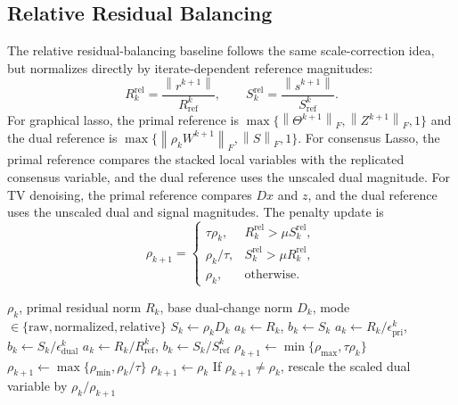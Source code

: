 \documentclass[11pt]{article}
\newcommand{\norm}[1]{\left\lVert #1 \right\rVert}
\begin{document}
\subsection{Relative Residual Balancing}

The relative residual-balancing baseline follows the same scale-correction
idea, but normalizes directly by iterate-dependent reference magnitudes:
\begin{equation}
    R_k^{\mathrm{rel}}
    =
    \frac{\norm{r^{k+1}}}{R_{\mathrm{ref}}^k},
    \qquad
    S_k^{\mathrm{rel}}
    =
    \frac{\norm{s^{k+1}}}{S_{\mathrm{ref}}^k}.
\end{equation}
For graphical lasso, the primal reference is
$\max\{\norm{\Theta^{k+1}}_F,\norm{Z^{k+1}}_F,1\}$ and the dual reference is
$\max\{\norm{\rho_k W^{k+1}}_F,\norm{S}_F,1\}$.  For consensus Lasso, the
primal reference compares the stacked local variables with the replicated
consensus variable, and the dual reference uses the unscaled dual magnitude.
For TV denoising, the primal reference compares $Dx$ and $z$, and the dual
reference uses the unscaled dual and signal magnitudes.  The penalty update is
\begin{equation}
    \rho_{k+1}
    =
    \begin{cases}
        \tau\rho_k, & R_k^{\mathrm{rel}}>\mu S_k^{\mathrm{rel}},\\
        \rho_k/\tau, & S_k^{\mathrm{rel}}>\mu R_k^{\mathrm{rel}},\\
        \rho_k, & \text{otherwise}.
    \end{cases}
\end{equation}

\begin{algorithm}[t]
\caption{Residual-balancing penalty update}
\label{alg:residual-balancing}
\begin{algorithmic}[1]
\Require $\rho_k$, primal residual norm $R_k$, base dual-change norm $D_k$,
         mode $\in\{\mathrm{raw},\mathrm{normalized},\mathrm{relative}\}$
\State $S_k\gets \rho_k D_k$
    \State $a_k\gets R_k$, $b_k\gets S_k$
    \State $a_k\gets R_k/\epsilon_{\mathrm{pri}}^k$,
           $b_k\gets S_k/\epsilon_{\mathrm{dual}}^k$
\Else
    \State $a_k\gets R_k/R_{\mathrm{ref}}^k$,
           $b_k\gets S_k/S_{\mathrm{ref}}^k$
\EndIf
{}
    \State $\rho_{k+1}\gets \min\{\rho_{\max},\tau\rho_k\}$
    \State $\rho_{k+1}\gets \max\{\rho_{\min},\rho_k/\tau\}$
\Else
    \State $\rho_{k+1}\gets \rho_k$
\EndIf
\State If $\rho_{k+1}\neq\rho_k$, rescale the scaled dual variable by
       $\rho_k/\rho_{k+1}$
\end{algorithmic}
\end{algorithm}
\end{document}
